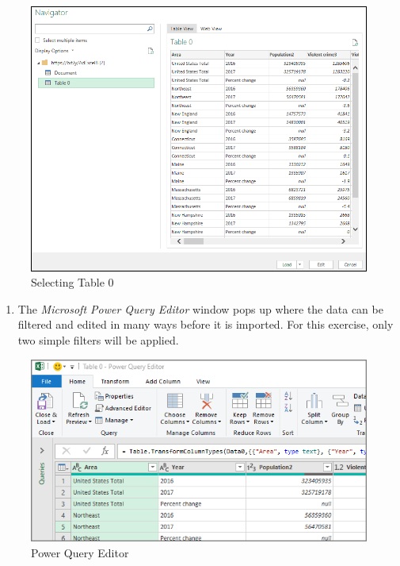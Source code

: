 \begin{figure}[H]
	\centering
	\includegraphics[width=\maxwidth{.95\linewidth}]{gfx/ch07_fig02d}
	\caption{Selecting Table 0}
	\label{07:fig02d}
\end{figure}

\begin{enumerate}[resume]
	\item The \textit{Microsoft Power Query Editor} window pops up where the data can be filtered and edited in many ways before it is imported. For this exercise, only two simple filters will be applied.
\end{enumerate}

\begin{figure}[H]
	\centering
	\includegraphics[width=\maxwidth{.95\linewidth}]{gfx/ch07_fig02e}
	\caption{Power Query Editor}
	\label{07:fig02e}
\end{figure}

